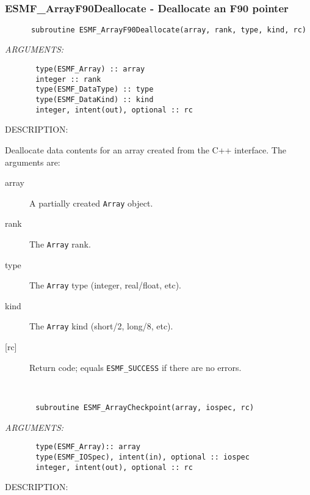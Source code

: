  
\mbox{}\hrulefill\ 
 
\subsubsection [ESMF\_ArrayF90Deallocate] {ESMF\_ArrayF90Deallocate - Deallocate an F90 pointer}


  
\begin{verbatim}      subroutine ESMF_ArrayF90Deallocate(array, rank, type, kind, rc)\end{verbatim}{\em ARGUMENTS:}
\begin{verbatim}       type(ESMF_Array) :: array
       integer :: rank
       type(ESMF_DataType) :: type
       type(ESMF_DataKind) :: kind
       integer, intent(out), optional :: rc\end{verbatim}
{\sf DESCRIPTION:\\ }


   Deallocate data contents for an array created from the C++ interface.
   The arguments are:
   \begin{description}
   \item[array]
   A partially created {\tt Array} object.
   \item[rank]
   The {\tt Array} rank.
   \item[type]
   The {\tt Array} type (integer, real/float, etc).
   \item[kind]
   The {\tt Array} kind (short/2, long/8, etc).
   \item[{[rc]}]
   Return code; equals {\tt ESMF\_SUCCESS} if there are no errors.
   \end{description}
   
 
\mbox{}\hrulefill\ 
 

\begin{verbatim}       subroutine ESMF_ArrayCheckpoint(array, iospec, rc)\end{verbatim}{\em ARGUMENTS:}
\begin{verbatim}       type(ESMF_Array):: array
       type(ESMF_IOSpec), intent(in), optional :: iospec
       integer, intent(out), optional :: rc\end{verbatim}
{\sf DESCRIPTION:\\ }


